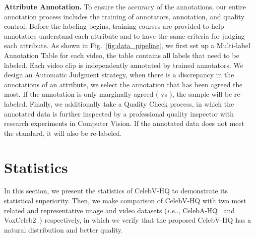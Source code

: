 \documentclass[runningheads]{llncs}
\makeatletter
\DeclareRobustCommand\onedot{\futurelet\@let@token\@onedot}
\def\@onedot{\ifx\@let@token.\else.\null\fi\xspace}
\def\ie{\emph{i.e}\onedot} \def\Ie{\emph{I.e}\onedot}
\makeatother
\begin{document}
\noindent
\textbf{Attribute Annotation.}
To ensure the accuracy of the annotations, our entire annotation process includes the training of annotators, annotation, and quality control. 
Before the labeling begins, training courses are provided to help annotators understand each attribute and to have the same criteria for judging each attribute. 
As shown in Fig.~\ref{fig:data_pipeline}, we first set up a Multi-label Annotation Table for each video, the table contains all labels that need to be labeled. Each video clip is independently annotated by  trained annotators. 
We design an Automatic Judgment strategy, when there is a discrepancy in the annotations of an attribute, we select the annotation that has been agreed the most. If the annotation is only marginally agreed ( vs ), the sample will be re-labeled.
Finally, we additionally take a Quality Check process, in which the annotated data is further inspected by a professional quality inspector with research experiments in Computer Vision. If the annotated data does not meet the standard, it will also be re-labeled.

\section{Statistics}


In this section, we present the statistics of CelebV-HQ to demonstrate its statistical superiority. 
Then, we make comparison of CelebV-HQ with two most related and representative image and video datasets (\ie, CelebA-HQ~\cite{celebahq} and VoxCeleb2~\cite{vox2}) respectively, in which we verify that the proposed CelebV-HQ has a natural distribution and better quality.
\end{document}
